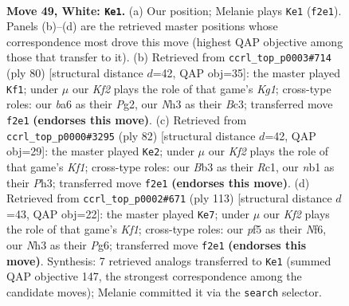 \documentclass[11pt]{article}
\begin{document}
\clearpage

\begin{figure}[p]\centering
\begin{subfigure}{0.46\textwidth}\centering
\resizebox{\linewidth}{!}{%
\newchessgame
\chessboard[
  setfen={6k1/r4p1p/b5p1/4Pp2/5P2/1B5N/P4KPP/1n6 w - - 6 49},
  showmover=false,
  pgfstyle=straightmove, color=movearrow, markmove={f2-e1}
]}
\caption{}
\end{subfigure}\hfill
\begin{subfigure}{0.46\textwidth}\centering
\resizebox{\linewidth}{!}{%
\newchessgame
\chessboard[
  setfen={8/r3bp2/1R2p1kp/4P3/p2P3p/2B2P2/3P2P1/6K1 w - - 0 41},
  showmover=false,
  pgfstyle=straightmove, color=movearrow, markmove={g1-f1}
]}
\caption{}
\end{subfigure}
\\[4pt]
\begin{subfigure}{0.46\textwidth}\centering
\resizebox{\linewidth}{!}{%
\newchessgame
\chessboard[
  setfen={8/5pk1/2rb1pp1/3N4/2p3P1/4P2P/5P2/2R2K2 w - - 2 42},
  showmover=false,
  pgfstyle=straightmove, color=movearrow, markmove={f1-e2}
]}
\caption{}
\end{subfigure}\hfill
\begin{subfigure}{0.46\textwidth}\centering
\resizebox{\linewidth}{!}{%
\newchessgame
\chessboard[
  setfen={5k2/5pp1/5np1/3p4/R2P3P/2r3P1/B4PK1/8 b - - 2 57},
  showmover=false,
  pgfstyle=straightmove, color=movearrow, markmove={f8-e7}
]}
\caption{}
\end{subfigure}
\caption{\textbf{Move 49, White: \texttt{Ke1}.} (a) Our position; Melanie plays \texttt{Ke1} (\texttt{f2e1}). Panels (b)--(d) are the retrieved master positions whose correspondence most drove this move (highest QAP objective among those that transfer to it). (b) Retrieved from \texttt{ccrl\_top\_p0003\#714} (ply 80) [structural distance $d$=42, QAP obj=35]: the master played \texttt{Kf1}; under $\mu$ our \emph{Kf2} plays the role of that game's \emph{Kg1}; cross-type roles: our \emph{b}a6 as their \emph{P}g2, our \emph{N}h3 as their \emph{B}c3; transferred move \texttt{f2e1} \textbf{(endorses this move)}. (c) Retrieved from \texttt{ccrl\_top\_p0000\#3295} (ply 82) [structural distance $d$=42, QAP obj=29]: the master played \texttt{Ke2}; under $\mu$ our \emph{Kf2} plays the role of that game's \emph{Kf1}; cross-type roles: our \emph{B}b3 as their \emph{R}c1, our \emph{n}b1 as their \emph{P}h3; transferred move \texttt{f2e1} \textbf{(endorses this move)}. (d) Retrieved from \texttt{ccrl\_top\_p0002\#671} (ply 113) [structural distance $d$=43, QAP obj=22]: the master played \texttt{Ke7}; under $\mu$ our \emph{Kf2} plays the role of that game's \emph{Kf1}; cross-type roles: our \emph{p}f5 as their \emph{N}f6, our \emph{N}h3 as their \emph{P}g6; transferred move \texttt{f2e1} \textbf{(endorses this move)}. Synthesis: 7 retrieved analogs transferred to \texttt{Ke1} (summed QAP objective 147, the strongest correspondence among the candidate moves); Melanie committed it via the \texttt{search} selector.}
\label{fig:thought-m96}
\end{figure}
\end{document}
